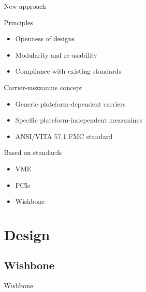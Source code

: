 \documentclass[compress,red]{beamer}
\begin{document}
\begin{frame}{New approach}

  \begin{block}{Principles}
    \begin{itemize}
    \item
      Openness of designs
    \item
      Modularity and re-usability
    \item
      Compliance with existing standards
    \end{itemize}
  \end{block}

  \begin{block}{Carrier-mezzanine concept}
    \begin{itemize}
    \item
      Generic plateform-dependent carriers
    \item
      Specific plateform-independent mezzanines
    \item
      ANSI/VITA 57.1 FMC standard
    \end{itemize}
  \end{block}

  \begin{block}{Based on standards}
    \begin{itemize}
    \item
      VME
    \item
      PCIe
    \item
      Wishbone
    \end{itemize}
  \end{block}

\end{frame}


\section{Design}

\subsection{Wishbone}

\begin{frame}{Wishbone}
\end{frame}
\end{document}
